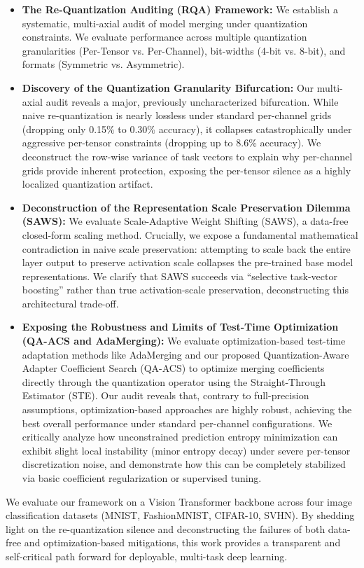 \begin{itemize}
  \item \textbf{The Re-Quantization Auditing (RQA) Framework:} We establish a systematic, multi-axial audit of model merging under quantization constraints. We evaluate performance across multiple quantization granularities (Per-Tensor vs. Per-Channel), bit-widths (4-bit vs. 8-bit), and formats (Symmetric vs. Asymmetric).
  \item \textbf{Discovery of the Quantization Granularity Bifurcation:} Our multi-axial audit reveals a major, previously uncharacterized bifurcation. While naive re-quantization is nearly lossless under standard per-channel grids (dropping only 0.15\% to 0.30\% accuracy), it collapses catastrophically under aggressive per-tensor constraints (dropping up to 8.6\% accuracy). We deconstruct the row-wise variance of task vectors to explain why per-channel grids provide inherent protection, exposing the per-tensor silence as a highly localized quantization artifact.
  \item \textbf{Deconstruction of the Representation Scale Preservation Dilemma (SAWS):} We evaluate Scale-Adaptive Weight Shifting (SAWS), a data-free closed-form scaling method. Crucially, we expose a fundamental mathematical contradiction in naive scale preservation: attempting to scale back the entire layer output to preserve activation scale collapses the pre-trained base model representations. We clarify that SAWS succeeds via ``selective task-vector boosting'' rather than true activation-scale preservation, deconstructing this architectural trade-off.
  \item \textbf{Exposing the Robustness and Limits of Test-Time Optimization (QA-ACS and AdaMerging):} We evaluate optimization-based test-time adaptation methods like AdaMerging and our proposed Quantization-Aware Adapter Coefficient Search (QA-ACS) to optimize merging coefficients directly through the quantization operator using the Straight-Through Estimator (STE). Our audit reveals that, contrary to full-precision assumptions, optimization-based approaches are highly robust, achieving the best overall performance under standard per-channel configurations. We critically analyze how unconstrained prediction entropy minimization can exhibit slight local instability (minor entropy decay) under severe per-tensor discretization noise, and demonstrate how this can be completely stabilized via basic coefficient regularization or supervised tuning.
\end{itemize}

We evaluate our framework on a Vision Transformer backbone across four image classification datasets (MNIST, FashionMNIST, CIFAR-10, SVHN). By shedding light on the re-quantization silence and deconstructing the failures of both data-free and optimization-based mitigations, this work provides a transparent and self-critical path forward for deployable, multi-task deep learning.